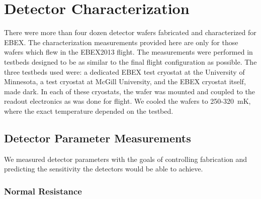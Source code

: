 \chapter{Detector Characterization}
\label{characterization_chapter}

There were more than four dozen detector wafers fabricated and characterized for \ac{EBEX}. 
The characterization measurements provided here are only for those wafers which flew in the \ac{EBEX2013} flight. 
The measurements were performed in testbeds designed to be as similar to the final flight configuration as possible. 
The three testbeds used were: a dedicated \ac{EBEX} test cryostat at the University of Minnesota, a test cryostat at McGill University, and the \ac{EBEX} cryostat itself, made dark. 
In each of these cryostats, the wafer was mounted and coupled to the readout electronics as was done for flight. 
We cooled the wafers to 250-320~mK, where the exact temperature depended on the testbed. 


\section{Detector Parameter Measurements}
\label{sec:parameter_measurements}

We measured detector parameters with the goals of controlling fabrication and predicting the sensitivity the detectors would be able to achieve. 

\subsection{Normal Resistance}
\label{sec:normal_resistance}

